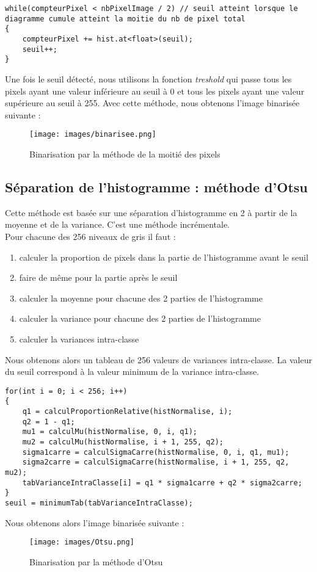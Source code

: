\documentclass{article}
\begin{document}
 \begin{lstlisting}
while(compteurPixel < nbPixelImage / 2) // seuil atteint lorsque le diagramme cumule atteint la moitie du nb de pixel total
{
    compteurPixel += hist.at<float>(seuil);
    seuil++;
}
 \end{lstlisting}

Une fois le seuil détecté, nous utilisons la fonction \emph{treshold} qui passe tous les pixels ayant une valeur inférieure au seuil à 0 et tous les pixels ayant une valeur supérieure au seuil à 255.
 Avec cette méthode, nous obtenons l'image binarisée suivante : 

 \begin{figure}[h!]
   \centering
   \caption{Binarisation par la méthode de la moitié des pixels}
   \texttt{[image: images/binarisee.png]}
\end{figure}


 \subsection{Séparation de l'histogramme : méthode d'Otsu}
 Cette méthode est basée sur une séparation d'histogramme en 2 à partir de la moyenne et de la variance. C'est une méthode incrémentale.\\

 Pour chacune des 256 niveaux de gris il faut :
 \begin{enumerate}
 	\item calculer la proportion de pixels dans la partie de l'histogramme avant le seuil
 	\item faire de même pour la partie après le seuil
 	\item calculer la moyenne pour chacune des 2 parties de l'histogramme
 	\item calculer la variance pour chacune des 2 parties de l'histogramme
 	\item calculer la variances intra-classe
 \end{enumerate}
 Nous obtenons alors un tableau de 256 valeurs de variances intra-classe. La valeur du seuil correspond à la valeur minimum de la variance intra-classe.\\

 \begin{lstlisting}
for(int i = 0; i < 256; i++)
{
    q1 = calculProportionRelative(histNormalise, i);
    q2 = 1 - q1;
    mu1 = calculMu(histNormalise, 0, i, q1);
    mu2 = calculMu(histNormalise, i + 1, 255, q2);
    sigma1carre = calculSigmaCarre(histNormalise, 0, i, q1, mu1);
    sigma2carre = calculSigmaCarre(histNormalise, i + 1, 255, q2, mu2);
    tabVarianceIntraClasse[i] = q1 * sigma1carre + q2 * sigma2carre;
}
seuil = minimumTab(tabVarianceIntraClasse);
 \end{lstlisting}

 Nous obtenons alors l'image binarisée suivante : 

 \begin{figure}[h!]
   \centering
   \caption{Binarisation par la méthode d'Otsu}
   \texttt{[image: images/Otsu.png]}
\end{figure}

 
\end{document}
